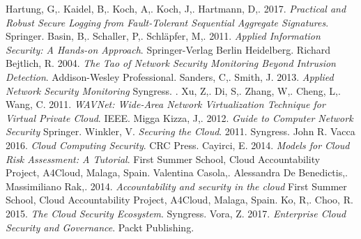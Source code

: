 \documentclass{article}
\begin{document}
\begin{desctiption}
\begin{thebibliography}{9}
        Hartung, G,.
        Kaidel, B,.
        Koch, A,.
        Koch, J,.
        Hartmann, D,.
        2017.
	\textit{Practical and Robust Secure Logging from Fault-Tolerant Sequential Aggregate Signatures}.
        Springer.
        Basin, B,.
        Schaller, P,.
        Schläpfer, M,.
        2011.
	\textit{Applied Information Security: A Hands-on Approach}.
        Springer-Verlag Berlin Heidelberg.
        Richard Bejtlich, R.
        2004.
	\textit{The Tao of Network Security Monitoring Beyond Intrusion Detection}.
        Addison-Wesley Professional.
        Sanders, C,.
	Smith, J.
        2013.
        \textit{Applied Network Security Monitoring}
	Syngress.
.
        Xu, Z,.
        Di, S,.
        Zhang, W,.
        Cheng, L,.
        Wang, C.
	2011.
        \textit{WAVNet: Wide-Area Network Virtualization Technique for Virtual Private Cloud}.
        IEEE.
        Migga Kizza, J,.
        2012.
        \textit{Guide to Computer Network Security}
	Springer.
        Winkler, V.
	\textit{Securing the Cloud}.
        2011.
        Syngress.
        John R. Vacca
        2016.
        \textit{Cloud Computing Security}.
	CRC Press.
        Cayirci, E.
	2014.
        \textit{Models for Cloud Risk Assessment: A Tutorial}.
        First Summer School, Cloud Accountability Project, A4Cloud, Malaga, Spain.
        Valentina Casola,.
        Alessandra De Benedictis,.
        Massimiliano Rak,.
        2014.
	\textit{Accountability and security in the cloud}
       	First Summer School, Cloud Accountability Project, A4Cloud, Malaga, Spain. 
        Ko, R,. 
	Choo, R.
        2015.
        \textit{The Cloud Security Ecosystem}.
	Syngress.
        Vora, Z.
        2017.
	\textit{Enterprise Cloud Security and Governance}.
	Packt Publishing.

\end{thebibliography}
\end{desctiption}
\end{document}

